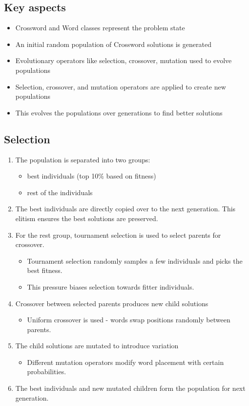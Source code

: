 \documentclass{article}
\begin{document}
\subsection*{Key aspects}
	
\begin{itemize}
			\item Crossword and Word classes represent the problem state
			\item An initial random population of Crossword solutions is generated
			\item Evolutionary operators like selection, crossover, mutation used to evolve populations
			\item Selection, crossover, and mutation operators are applied to create new populations
			\item This evolves the populations over generations to find better solutions
\end{itemize}


\subsection*{Selection}

\begin{enumerate}
		\item The population is separated into two groups:
			\begin{itemize}
					\item best individuals (top 10\% based on fitness)
					\item rest of the individuals
			\end{itemize}
		\item The best individuals are directly copied over to the next generation. This elitism ensures the best solutions are preserved.
		\item For the rest group, tournament selection is used to select parents for crossover.
			\begin{itemize}
					\item Tournament selection randomly samples a few individuals and picks the best fitness.
					\item This pressure biases selection towards fitter individuals.
			\end{itemize}
		\item Crossover between selected parents produces new child solutions
			\begin{itemize}
					\item Uniform crossover is used - words swap positions randomly between parents.
			\end{itemize}
		\item The child solutions are mutated to introduce variation
			\begin{itemize}
					\item Different mutation operators modify word placement with certain probabilities.
			\end{itemize}
		\item The best individuals and new mutated children form the population for next generation.
\end{enumerate}
\end{document}
